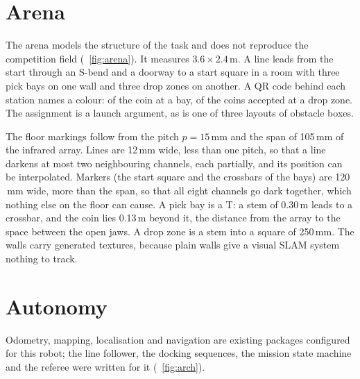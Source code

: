 \documentclass[conference,a4paper]{IEEEtran}
\newcommand{\unit}[1]{\ensuremath{\,\mathrm{#1}}}
\begin{document}
\section{Arena}
\label{sec:arena}
The arena models the structure of the task and does not reproduce the competition field
(\figurename~\ref{fig:arena}). It measures $3.6\times2.4\unit{m}$. A line leads from the
start through an S-bend and a doorway to a start square in a room with three pick bays on
one wall and three drop zones on another. A QR code behind each station names a colour: of
the coin at a bay, of the coins accepted at a drop zone. The assignment is a launch argument,
as is one of three layouts of obstacle boxes.

The floor markings follow from the pitch $p=15\unit{mm}$ and the span of 105\unit{mm} of the
infrared array. Lines are 12\unit{mm} wide, less than one pitch, so that a line darkens at
most two neighbouring channels, each partially, and its position can be interpolated.
Markers (the start square and the crossbars of the bays) are 120\unit{mm} wide, more than
the span, so that all eight channels go dark together, which nothing else on the floor can
cause. A pick bay is a T: a stem of 0.30\unit{m} leads to a crossbar, and the coin lies
0.13\unit{m} beyond it, the distance from the array to the space between the open jaws. A
drop zone is a stem into a square of 250\unit{mm}. The walls carry generated textures,
because plain walls give a visual SLAM system nothing to track.

\section{Autonomy}
\label{sec:auto}
Odometry, mapping, localisation and navigation are existing packages configured for this
robot; the line follower, the docking sequences, the mission state machine and the referee
were written for it (\figurename~\ref{fig:arch}).
\end{document}
